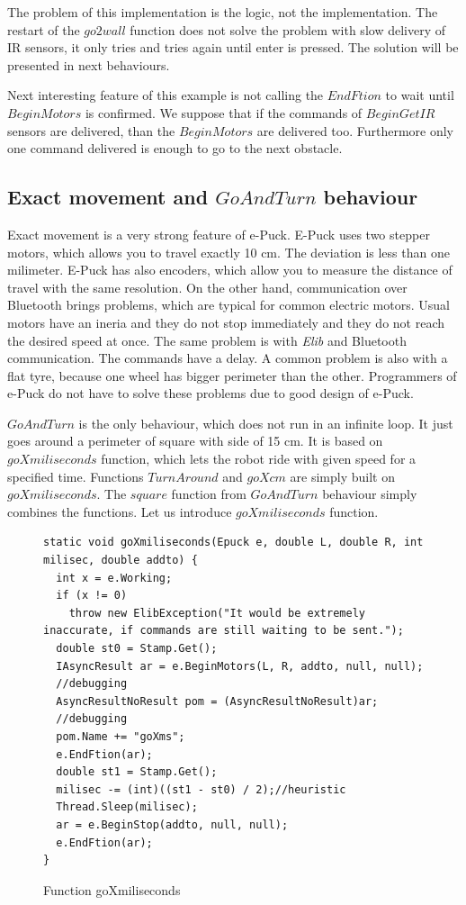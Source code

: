 \documentclass[12pt,notitlepage]{report}
\begin{document}
	The problem of this implementation is the logic, not the implementation. 
	The restart of the $go2wall$ function does not solve the problem with 
	slow delivery of IR sensors, it only tries and tries again until enter is pressed.
	The solution will be presented in next behaviours.

	Next interesting feature of this example is not calling the $EndFtion$ to wait until $BeginMotors$ is confirmed.
	We suppose that if the commands of $BeginGetIR$ sensors are delivered, than the $BeginMotors$ are delivered too.
	Furthermore only one command delivered is enough to go to the next obstacle.

\subsection{Exact movement and $GoAndTurn$ behaviour} \label{sec:go}
	Exact movement is a very strong feature of e-Puck. E-Puck uses two stepper motors,
	which allows you to travel exactly 10 cm. The deviation is less than one milimeter.
	E-Puck has also encoders, which allow you to measure the distance of travel with the same resolution.
	On the other hand, communication over Bluetooth brings problems, which are typical for common electric motors.
	Usual motors have an ineria and they do not stop immediately and they do not reach the desired speed at once. The same problem is with 
	{\it Elib} and Bluetooth communication. The commands have a delay.
	A common problem is also with a flat tyre, because one wheel has bigger perimeter than the other.
	Programmers of e-Puck do not have to solve these problems due to good design of e-Puck.

	$GoAndTurn$ is the only behaviour, which does not run in an infinite loop. 
	It just goes around a perimeter of square with side
	of 15 cm. It is based on $goXmiliseconds$ function, which lets the robot ride with given speed for a specified time.
	Functions $TurnAround$ and $goXcm$ are simply built on $goXmiliseconds$. The $square$ function from $GoAndTurn$ behaviour
	simply combines the functions.
	Let us introduce $goXmiliseconds$ function.
\begin{figure}[!hbp]
\begin{lstlisting}
static void goXmiliseconds(Epuck e, double L, double R, int milisec, double addto) {
  int x = e.Working;
  if (x != 0)
    throw new ElibException("It would be extremely inaccurate, if commands are still waiting to be sent.");
  double st0 = Stamp.Get();
  IAsyncResult ar = e.BeginMotors(L, R, addto, null, null);
  //debugging
  AsyncResultNoResult pom = (AsyncResultNoResult)ar;
  //debugging
  pom.Name += "goXms";
  e.EndFtion(ar);
  double st1 = Stamp.Get();
  milisec -= (int)((st1 - st0) / 2);//heuristic
  Thread.Sleep(milisec);
  ar = e.BeginStop(addto, null, null);
  e.EndFtion(ar);
}
\end{lstlisting}
\caption{Function goXmiliseconds} \label{gox}
\end{figure}
\end{document}
